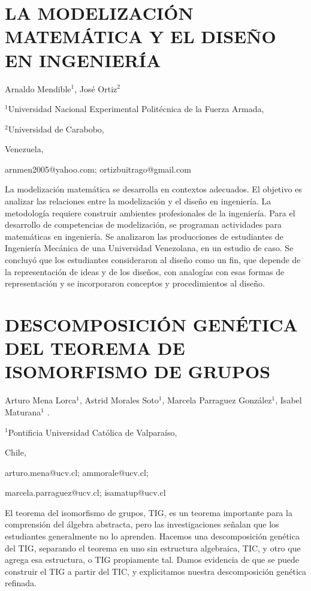\section{LA MODELIZACIÓN MATEMÁTICA Y EL DISEÑO EN INGENIERÍA}

\begin{datos}

Arnaldo Mendible$^{1}$, José Ortiz$^{2}$

$^{1}$Universidad Nacional Experimental Politécnica de la Fuerza
Armada,

$^{2}$Universidad de Carabobo,

Venezuela, 

arnmen2005@yahoo.com; ortizbuitrago@gmail.com

\end{datos}

La modelización matemática se desarrolla en contextos adecuados. El
objetivo es analizar las relaciones entre la modelización y el diseño
en ingeniería. La metodología requiere construir ambientes profesionales
de la ingeniería. Para el desarrollo de competencias de modelización,
se programan actividades para matemáticas en ingeniería. Se analizaron
las producciones de estudiantes de Ingeniería Mecánica de una Universidad
Venezolana, en un estudio de caso. Se concluyó que los estudiantes
consideraron al diseño como un fin, que depende de la representación
de ideas y de los diseños, con analogías con esas formas de representación
y se incorporaron conceptos y procedimientos al diseño.


\section{DESCOMPOSICIÓN GENÉTICA DEL TEOREMA DE ISOMORFISMO DE GRUPOS}

\begin{datos}

Arturo Mena Lorca$^{1}$, Astrid Morales Soto$^{1}$, Marcela Parraguez
González$^{1}$, Isabel Maturana$^{1}$ .

$^{1}$Pontificia Universidad Católica de Valparaíso,

Chile,

arturo.mena@ucv.cl; ammorale@ucv.cl;

marcela.parraguez@ucv.cl; isamatup@ucv.cl

\end{datos}

El teorema del isomorfismo de grupos, TIG, es un teorema importante
para la comprensión del álgebra abstracta, pero las investigaciones
señalan que los estudiantes generalmente no lo aprenden. Hacemos una
descomposición genética del TIG, separando el teorema en uno sin estructura
algebraica, TIC, y otro que agrega esa estructura, o TIG propiamente
tal. Damos evidencia de que se puede construir el TIG a partir del
TIC, y explicitamos nuestra descomposición genética refinada. 


